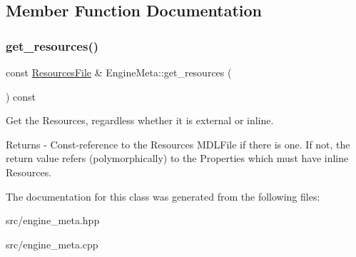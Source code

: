 \subsection{Member Function Documentation}
\mbox{\label{class_engine_meta_a3834c2a1d2fb9a957ac856dd50f33cd4}} 
\subsubsection{\texorpdfstring{get\+\_\+resources()}{get\_resources()}}
{\footnotesize\ttfamily const \mbox{\hyperlink{class_resources_file}{Resources\+File}} \& Engine\+Meta\+::get\+\_\+resources (\begin{DoxyParamCaption}{ }\end{DoxyParamCaption}) const}

Get the Resources, regardless whether it is external or inline. \begin{DoxyReturn}{Returns}
-\/ Const-\/reference to the Resources M\+D\+L\+File if there is one. If not, the return value refers (polymorphically) to the Properties which must have inline Resources. 
\end{DoxyReturn}


The documentation for this class was generated from the following files\+:\begin{DoxyCompactItemize}
\item 
src/engine\+\_\+meta.\+hpp\item 
src/engine\+\_\+meta.\+cpp\end{DoxyCompactItemize}
